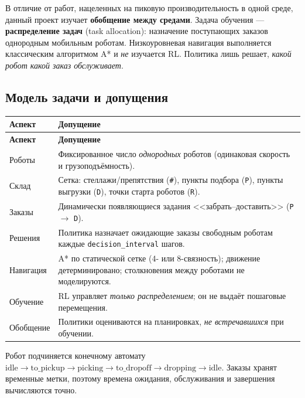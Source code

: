 \documentclass[11pt,a4paper]{article}
\newcommand{\code}[1]{\texttt{#1}}
\begin{document}
В отличие от работ, нацеленных на пиковую производительность в одной среде,
данный проект изучает \textbf{обобщение между средами}. Задача обучения —
\textbf{распределение задач} (task allocation): назначение поступающих заказов
однородным мобильным роботам. Низкоуровневая навигация выполняется классическим
алгоритмом A* и \emph{не} изучается RL. Политика лишь решает, \emph{какой робот
какой заказ обслуживает}.

\subsection{Модель задачи и допущения}
\begin{longtable}{@{}p{}p{}@{}}
\toprule
\textbf{Аспект} & \textbf{Допущение} \\
\midrule
\endfirsthead
\toprule
\textbf{Аспект} & \textbf{Допущение} \\
\midrule
\endhead
Роботы & Фиксированное число \emph{однородных} роботов (одинаковая скорость и
грузоподъёмность). \\
Склад & Сетка: стеллажи/препятствия (\code{\#}), пункты подбора (\code{P}),
пункты выгрузки (\code{D}), точки старта роботов (\code{R}). \\
Заказы & Динамически появляющиеся задания <<забрать--доставить>> (\code{P}
$\rightarrow$ \code{D}). \\
Решения & Политика назначает ожидающие заказы свободным роботам каждые
\code{decision\_interval} шагов. \\
Навигация & A* по статической сетке (4- или 8-связность); движение
детерминировано; столкновения между роботами не моделируются. \\
Обучение & RL управляет \emph{только распределением}; он не выдаёт пошаговые
перемещения. \\
Обобщение & Политики оцениваются на планировках, \emph{не встречавшихся} при
обучении. \\
\bottomrule
\end{longtable}

Робот подчиняется конечному автомату
$\text{idle} \rightarrow \text{to\_pickup} \rightarrow \text{picking} \rightarrow
\text{to\_dropoff} \rightarrow \text{dropping} \rightarrow \text{idle}$.
Заказы хранят временные метки, поэтому времена ожидания, обслуживания и
завершения вычисляются точно.
\end{document}
